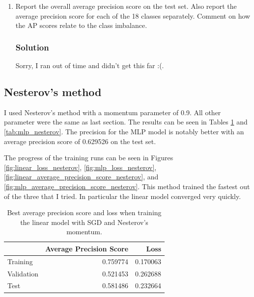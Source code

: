 \documentclass[letterpaper,11pt]{article}
\begin{document}
\begin{enumerate}
\item Report the overall average precision score on the test set. Also report
  the average precision score for each of the 18 classes separately. Comment on
  how the AP scores relate to the class imbalance.

  \subsubsection*{Solution}

  Sorry, I ran out of time and didn't get this far :(.
  
\end{enumerate}

\subsection*{Nesterov's method}

I used Nesterov's method with a momentum parameter of 0.9. All other parameter
were the same as last section. The results can be seen in Tables
\ref{tab:linear_nesterov} and \ref{tab:mlp_nesterov}. The precision for the MLP
model is notably better with an average precision score of 0.629526 on the test
set.

The progress of the training runs can be seen in Figures
\ref{fig:linear_loss_nesterov}, \ref{fig:mlp_loss_nesterov},
\ref{fig:linear_average_precision_score_nesterov}, and
\ref{fig:mlp_average_precision_score_nesterov}. This method trained the fastest
out of the three that I tried. In particular the linear model converged very
quickly.

  \begin{table}
    \centering
    \begin{tabular}{lrr}
      \toprule
      {} &  Average Precision Score &      Loss \\
      \midrule
      Training   &                 0.759774 &  0.170063 \\
      Validation &                 0.521453 &  0.262688 \\
      Test       &                 0.581486 &  0.232664 \\
      \bottomrule
    \end{tabular}
    \caption{Best average precision score and loss when training the linear
      model with SGD and Nesterov's momentum.}
    \label{tab:linear_nesterov}
  \end{table}
\end{document}
